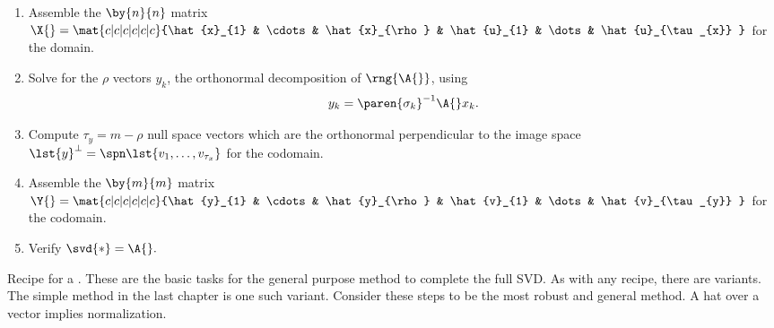 \begin{table}[h]
\begin{enumerate}
\item Assemble the $\by{n}{n}$ matrix 
$\X{}=\mat{c|c|c|c|c|c}
{\hat{x}_{1} & \cdots & \hat{x}_{\rho} & \hat{u}_{1} & \dots & \hat{u}_{\tau_{x}}
}
$
for the domain.\\[4pt]
\item Solve for the $\rho$ vectors $y_{k}$, the orthonormal decomposition of $\rng{\A{}}$, using
\begin{equation}
  y_{k} = \paren{\sigma_{k}}^{-1}\A{} x_{k}.
\end{equation}
\item Compute $\tau_{y}=m-\rho$ null space vectors which are the  orthonormal perpendicular to the image space $\lst{y}^{\perp}=\spn\lst{v_{1},\dots,v_{\tau_{x}}}$ for the codomain.\\[4pt]
\item Assemble the $\by{m}{m}$ matrix 
$\Y{}=\mat{c|c|c|c|c|c}
{\hat{y}_{1} & \cdots & \hat{y}_{\rho} & \hat{v}_{1} & \dots & \hat{v}_{\tau_{y}}
}
$ for the codomain.\\[4pt]
\item Verify $\svd{*} = \A{}.$\\[6pt]
\end{enumerate}
\caption[Recipe for a \svdl]{Recipe for a \svdl. These are the basic tasks for the general purpose method to complete the full SVD. As with any recipe, there are variants. The simple method in the last chapter is one such variant. Consider these steps to be the most robust and general method. A hat over a vector implies normalization.}
\label{tab:3:input}
\end{table}

\clearpage
\break

\endinput